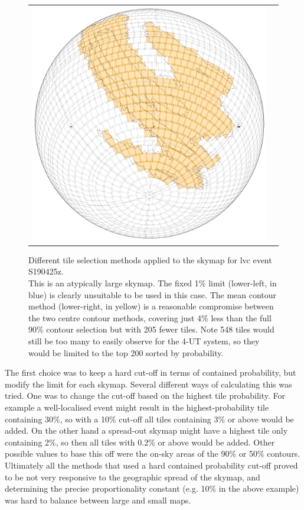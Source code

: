 \begin{colsection}
\begin{colsection}
\begin{figure}[p]
\begin{center}
\begin{tabular}{cc}
\includegraphics[width=0.25\linewidth]{images/tiling/3_b.png}
\\

\end{tabular}
\end{center}
\caption[Different tile selection methods for S190425z]{Different tile selection methods applied to the skymap for \gls{lvc} event S190425z.\\
This is an atypically large skymap. The fixed 1\% limit (lower-left, in blue) is clearly unsuitable to be used in this case. The mean contour method (lower-right, in yellow) is a reasonable compromise between the two centre contour methods, covering just 4\% less than the full 90\% contour selection but with 205 fewer tiles. Note 548 tiles would still be too many to easily observe for the 4-UT system, so they would be limited to the top 200 sorted by probability.
}
\label{fig:tiling_S190425z}
\end{figure}


\clearpage

The first choice was to keep a hard cut-off in terms of contained probability, but modify the limit for each skymap. Several different ways of calculating this was tried. One was to change the cut-off based on the highest tile probability. For example a well-localised event might result in the highest-probability tile containing $30\%$, so with a 10\% cut-off all tiles containing 3\% or above would be added. On the other hand a spread-out skymap might have a highest tile only containing 2\%, so then all tiles with 0.2\% or above would be added. Other possible values to base this off were the on-sky areas of the 90\% or 50\% contours. Ultimately all the methods that used a hard contained probability cut-off proved to be not very responsive to the geographic spread of the skymap, and determining the precise proportionality constant (e.g. 10\% in the above example) was hard to balance between large and small maps.


\end{colsection}
\end{colsection}
